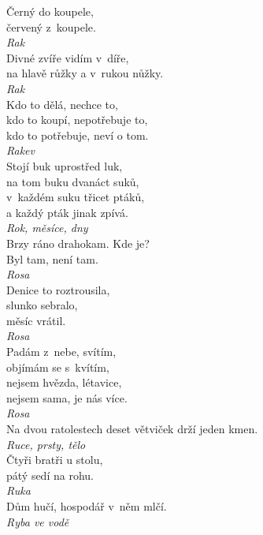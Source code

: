 \begin{multicols}{4}
\noindent
Černý do koupele,\\
červený z~koupele.\\[1 mm]
{\sl Rak}\\

\noindent
Divné zvíře vidím v~díře,\\
na hlavě růžky a v~rukou nůžky.\\[1 mm]
{\sl Rak}\\

\noindent
Kdo to dělá, nechce to,\\
kdo to koupí, nepotřebuje to,\\
kdo to potřebuje, neví o tom.\\[1 mm]
{\sl Rakev}\\

\noindent
Stojí buk uprostřed luk,\\
na tom buku dvanáct suků,\\
v~každém suku třicet ptáků,\\
a každý pták jinak zpívá.\\[1 mm]
{\sl Rok, měsíce, dny}\\

\noindent
Brzy ráno drahokam. Kde je?\\
Byl tam, není tam.\\[1 mm]
{\sl Rosa}\\

\noindent
Denice to roztrousila,\\
slunko sebralo,\\
měsíc vrátil.\\[1 mm]
{\sl Rosa}\\

\noindent
Padám z~nebe, svítím,\\
objímám se s~kvítím,\\
nejsem hvězda, létavice,\\
nejsem sama, je nás více.\\[1 mm]
{\sl Rosa}\\

\noindent
Na dvou ratolestech deset větviček drží jeden kmen.\\[1 mm]
{\sl Ruce, prsty, tělo}\\

\noindent
Čtyři bratři u stolu, \\
pátý sedí na rohu.\\[1 mm]
{\sl Ruka}\\

\noindent
Dům hučí, hospodář v~něm mlčí.\\[1 mm]
{\sl Ryba ve vodě}\\


\end{multicols}
